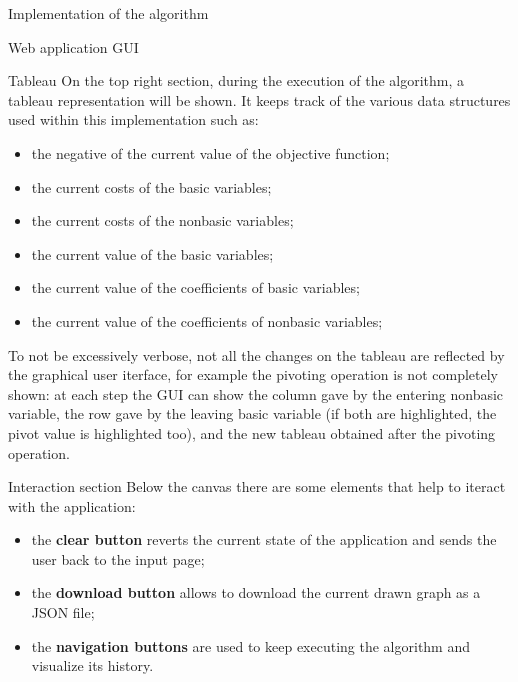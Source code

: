 \documentclass[9pt]{extarticle}
\begin{document}
\begin{section}{Implementation of the algorithm}
\begin{subsection}{Web application GUI}
            \begin{subsubsection}{Tableau}
                On the top right section, during the execution of the algorithm, a tableau representation will be shown.
                It keeps track of the various data structures used within this implementation such as:
                \begin{itemize}
                    \item the negative of the current value of the objective function;
                    \item the current costs of the basic variables;
                    \item the current costs of the nonbasic variables;
                    \item the current value of the basic variables;
                    \item the current value of the coefficients of basic variables;
                    \item the current value of the coefficients of nonbasic variables;
                \end{itemize}
                
                To not be excessively verbose, not all the changes on the tableau are reflected by the graphical user iterface, for example
                the pivoting operation is not completely shown: at each step the GUI can show the column gave by the entering nonbasic variable,
                the row gave by the leaving basic variable (if both are highlighted, the pivot value is highlighted too), and the new tableau obtained
                after the pivoting operation.
            \end{subsubsection}

            \begin{subsubsection}{Interaction section}
                \label{subsec:interaction}
                Below the canvas there are some elements that help to iteract with the application:
                \begin{itemize}
                    \item the \textbf{clear button} reverts the current state of the application and sends the user back to the input page;
                    \item the \textbf{download button} allows to download the current drawn graph as a JSON file;
                    \item the \textbf{navigation buttons} are used to keep executing the algorithm and visualize its history.
                \end{itemize}


\end{subsubsection}
\end{subsection}
\end{section}
\end{document}
